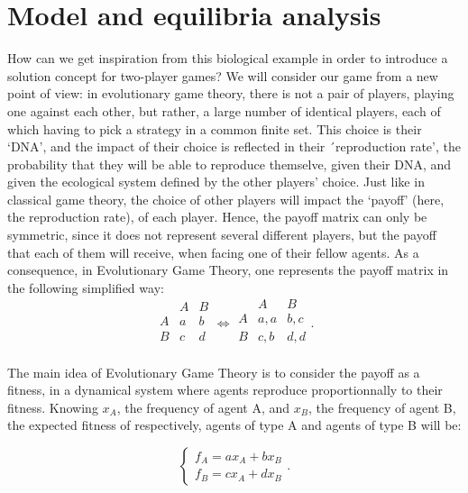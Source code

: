 \section{Model and equilibria analysis}

How can we get inspiration from this biological example in order  to introduce a solution concept for two-player games?  We will consider our game from a new point of view: in evolutionary game theory, there is not a pair of players, playing one against each other, but rather, a large number of identical players, each of which having to pick a strategy in a common finite set.  This choice is their `DNA', and the impact of their choice is reflected in their ´reproduction rate', the probability that they will be able to reproduce themselve, given their DNA, and given the ecological system defined by the other players' choice.  Just like in classical game theory, the choice of other players will impact the `payoff' (here, the reproduction rate), of each player.  Hence, the payoff matrix can only be symmetric, since it does not represent several different players, but the payoff that each of them will receive, when facing one of their fellow agents. As a consequence, in Evolutionary Game Theory, one represents the payoff matrix in the following simplified way:
\begin{equation}
\begin{array}{l|cr}
 & A & B\\
\hline
A & a & b\\
B & c & d\\
\end{array}
\Longleftrightarrow
\begin{array}{l|cr}
 & A & B\\
\hline
A & a,a & b,c\\
B & c,b & d,d\\
\end{array}.
\label{payoff}
\end{equation}

The main idea of Evolutionary Game Theory is to consider the payoff as a fitness, in a dynamical system where agents reproduce proportionnally to their fitness.  Knowing $x_A$, the frequency of agent A, and $x_B$, the frequency of agent B, the expected fitness of respectively, agents of type A and agents of type B will be:

\begin{equation}
\begin{cases}
f_A = a x_A + bx_B \\
f_B = cx_A + dx_B
\end{cases}.
\label{syst2}
\end{equation}

